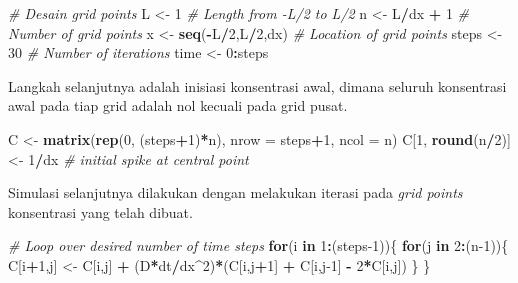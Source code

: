 \documentclass[
]{book}
\newenvironment{Shaded}{\begin{snugshade}}{\end{snugshade}}
\newcommand{\AttributeTok}[1]{\textcolor[rgb]{0.13,0.29,0.53}{#1}}
\newcommand{\CommentTok}[1]{\textcolor[rgb]{0.56,0.35,0.01}{\textit{#1}}}
\newcommand{\ControlFlowTok}[1]{\textcolor[rgb]{0.13,0.29,0.53}{\textbf{#1}}}
\newcommand{\DecValTok}[1]{\textcolor[rgb]{0.00,0.00,0.81}{#1}}
\newcommand{\FunctionTok}[1]{\textcolor[rgb]{0.13,0.29,0.53}{\textbf{#1}}}
\newcommand{\NormalTok}[1]{#1}
\newcommand{\OtherTok}[1]{\textcolor[rgb]{0.56,0.35,0.01}{#1}}
\newcommand{\SpecialCharTok}[1]{\textcolor[rgb]{0.81,0.36,0.00}{\textbf{#1}}}
\theoremstyle{definition}
\theoremstyle{definition}
\theoremstyle{definition}
\theoremstyle{definition}
\theoremstyle{remark}
\begin{document}
\begin{Shaded}
\begin{Highlighting}[]
\CommentTok{\# Desain grid points}
\NormalTok{L     }\OtherTok{\textless{}{-}} \DecValTok{1}                \CommentTok{\# Length from {-}L/2 to L/2}
\NormalTok{n     }\OtherTok{\textless{}{-}}\NormalTok{ L}\SpecialCharTok{/}\NormalTok{dx }\SpecialCharTok{+} \DecValTok{1}         \CommentTok{\# Number of grid points}
\NormalTok{x     }\OtherTok{\textless{}{-}} \FunctionTok{seq}\NormalTok{(}\SpecialCharTok{{-}}\NormalTok{L}\SpecialCharTok{/}\DecValTok{2}\NormalTok{,L}\SpecialCharTok{/}\DecValTok{2}\NormalTok{,dx) }\CommentTok{\# Location of grid points}
\NormalTok{steps }\OtherTok{\textless{}{-}} \DecValTok{30}               \CommentTok{\# Number of iterations}
\NormalTok{time  }\OtherTok{\textless{}{-}} \DecValTok{0}\SpecialCharTok{:}\NormalTok{steps}
\end{Highlighting}
\end{Shaded}

Langkah selanjutnya adalah inisiasi konsentrasi awal, dimana seluruh konsentrasi awal pada tiap grid adalah nol kecuali pada grid pusat.

\begin{Shaded}
\begin{Highlighting}[]
\NormalTok{C }\OtherTok{\textless{}{-}} \FunctionTok{matrix}\NormalTok{(}\FunctionTok{rep}\NormalTok{(}\DecValTok{0}\NormalTok{, (steps}\SpecialCharTok{+}\DecValTok{1}\NormalTok{)}\SpecialCharTok{*}\NormalTok{n), }\AttributeTok{nrow =}\NormalTok{ steps}\SpecialCharTok{+}\DecValTok{1}\NormalTok{, }\AttributeTok{ncol =}\NormalTok{ n)}
\NormalTok{C[}\DecValTok{1}\NormalTok{, }\FunctionTok{round}\NormalTok{(n}\SpecialCharTok{/}\DecValTok{2}\NormalTok{)] }\OtherTok{\textless{}{-}} \DecValTok{1}\SpecialCharTok{/}\NormalTok{dx  }\CommentTok{\# initial spike at central point}
\end{Highlighting}
\end{Shaded}

Simulasi selanjutnya dilakukan dengan melakukan iterasi pada \emph{grid points} konsentrasi yang telah dibuat.

\begin{Shaded}
\begin{Highlighting}[]
\CommentTok{\# Loop over desired number of time steps}
\ControlFlowTok{for}\NormalTok{(i }\ControlFlowTok{in} \DecValTok{1}\SpecialCharTok{:}\NormalTok{(steps}\DecValTok{{-}1}\NormalTok{))\{}
  \ControlFlowTok{for}\NormalTok{(j }\ControlFlowTok{in} \DecValTok{2}\SpecialCharTok{:}\NormalTok{(n}\DecValTok{{-}1}\NormalTok{))\{}
\NormalTok{    C[i}\SpecialCharTok{+}\DecValTok{1}\NormalTok{,j] }\OtherTok{\textless{}{-}}\NormalTok{ C[i,j] }\SpecialCharTok{+}\NormalTok{ (D}\SpecialCharTok{*}\NormalTok{dt}\SpecialCharTok{/}\NormalTok{dx}\SpecialCharTok{\^{}}\DecValTok{2}\NormalTok{)}\SpecialCharTok{*}\NormalTok{(C[i,j}\SpecialCharTok{+}\DecValTok{1}\NormalTok{] }\SpecialCharTok{+}\NormalTok{ C[i,j}\DecValTok{{-}1}\NormalTok{] }\SpecialCharTok{{-}} \DecValTok{2}\SpecialCharTok{*}\NormalTok{C[i,j])}
\NormalTok{  \}}
\NormalTok{\}}
\end{Highlighting}
\end{Shaded}
\end{document}
